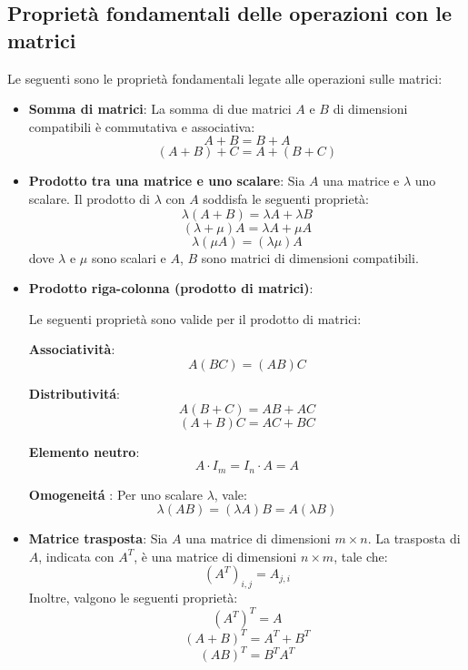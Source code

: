 \documentclass{article}
\begin{document}
\subsection{Proprietà fondamentali delle operazioni con le matrici}

Le seguenti sono le proprietà fondamentali legate alle operazioni sulle
matrici:

\begin{itemize}
	\item \textbf{Somma di matrici}: La somma di due matrici \( A \) e \( B \) di dimensioni
	      compatibili è commutativa e associativa:
	      \[
		      A + B = B + A
	      \]
	      \[
		      (A + B) + C = A + (B + C)
	      \]

	\item \textbf{Prodotto tra una matrice e uno scalare}: Sia \( A \) una matrice e \( \lambda \)
	      uno scalare. Il prodotto di \( \lambda \) con \( A \) soddisfa le seguenti proprietà:
	      \[
		      \lambda (A + B) = \lambda A + \lambda B
	      \]
	      \[
		      (\lambda + \mu) A = \lambda A + \mu A
	      \]
	      \[
		      \lambda (\mu A) = (\lambda \mu) A
	      \]
	      dove \( \lambda \) e \( \mu \) sono scalari e \( A \), \( B \) sono matrici di
	      dimensioni compatibili.

	\item \textbf{Prodotto riga-colonna (prodotto di matrici)}:

	      Le seguenti proprietà sono valide per il prodotto di matrici:

	      \textbf{Associatività}:
	      \[
		      A(BC) = (AB)C
	      \]

	      \textbf{Distributivitá}:
	      \[
		      A(B + C) = AB + AC
	      \]
	      \[
		      (A + B)C = AC + BC
	      \]

	      \textbf{Elemento neutro}:
	      \[
		      A \cdot I_m = I_n \cdot A = A
	      \]

	      \textbf{Omogeneitá }: Per uno scalare \( \lambda \), vale:
	      \[
		      \lambda (AB) = (\lambda A)B = A(\lambda B)
	      \]

	\item \textbf{Matrice trasposta}: Sia \( A \) una matrice di dimensioni \( m \times n \).
	      La trasposta di \( A \), indicata con \( A^T \), è una matrice di dimensioni \( n \times m \), tale che:
	      \[
		      (A^T)_{i,j} = A_{j,i}
	      \]
	      Inoltre, valgono le seguenti proprietà:
	      \[
		      (A^T)^T = A
	      \]
	      \[
		      (A + B)^T = A^T + B^T
	      \]
	      \[
		      (AB)^T = B^T A^T
	      \]
\end{itemize}
\end{document}
